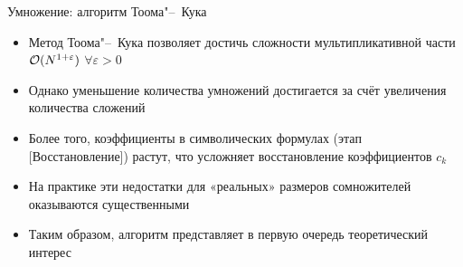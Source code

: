 \documentclass{ca-slides}
\begin{document}
\begin{canvasframe}{Умножение: алгоритм Тоома"--~Кука}
  \begin{itemize}
    \item Метод Тоома"--~Кука позволяет достичь сложности мультипликативной части
      $\mathcal{O}(N^{1+\varepsilon})$ $\forall \varepsilon > 0$
    \item Однако уменьшение количества умножений достигается за счёт увеличения количества сложений
    \item Более того, коэффициенты в символических формулах (этап [Восстановление]) растут, что
      усложняет восстановление коэффициентов $c_k$
    \item На практике эти недостатки для «реальных» размеров сомножителей оказываются существенными
    \item Таким образом, алгоритм представляет в первую очередь теоретический интерес
  \end{itemize}
\end{canvasframe}
\end{document}
